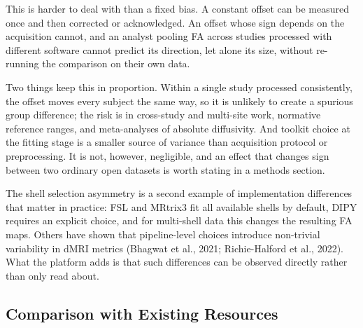 \documentclass[12pt,a4paper]{article}
\begin{document}
This is harder to deal with than a fixed bias. A constant offset can be measured once and then corrected or acknowledged. An offset whose sign depends on the acquisition cannot, and an analyst pooling FA across studies processed with different software cannot predict its direction, let alone its size, without re-running the comparison on their own data.

Two things keep this in proportion. Within a single study processed consistently, the offset moves every subject the same way, so it is unlikely to create a spurious group difference; the risk is in cross-study and multi-site work, normative reference ranges, and meta-analyses of absolute diffusivity. And toolkit choice at the fitting stage is a smaller source of variance than acquisition protocol or preprocessing. It is not, however, negligible, and an effect that changes sign between two ordinary open datasets is worth stating in a methods section.

The shell selection asymmetry is a second example of implementation differences that matter in practice: FSL and MRtrix3 fit all available shells by default, DIPY requires an explicit choice, and for multi-shell data this changes the resulting FA maps. Others have shown that pipeline-level choices introduce non-trivial variability in dMRI metrics (Bhagwat et al., 2021; Richie-Halford et al., 2022). What the platform adds is that such differences can be observed directly rather than only read about.

\subsection{Comparison with Existing Resources}\label{comparison-with-existing-resources}
\end{document}
